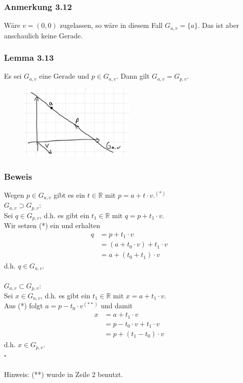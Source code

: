 \documentclass{article}
\begin{document}
\subsubsection*{Anmerkung 3.12}
Wäre $v=(0,0)$ zugelassen, so wäre in diesem Fall $G_{a,v} = \{a\}$. Das ist aber anschaulich keine Gerade. \\

\subsubsection*{Lemma 3.13}
Es sei $G_{a,v}$ eine Gerade und $p \in G_{a,v}$. Dann gilt $G_{a,v} = G_{p,v}$. \\
\begin{figure}[h]
    \centering
    \includegraphics[width=0.5\textwidth]{Images/3.13.jpeg}
    \caption{}
\end{figure}

\subsubsection*{Beweis}
Wegen $p \in G_{a,v}$ gibt es ein $t \in \mathbb{R}$ mit $p = a + t \cdot v.^{(*)}$
\\
\underline{\textit{$G_{a,v} \supset G_{p,v}$}}: \\
Sei $q \in G_{p,v}$, d.h. es gibt ein $t_1 \in \mathbb{R}$ mit $q = p + t_1 \cdot v$. \\
Wir setzen (*) ein und erhalten \\
\begin{align*}
    q &= p + t_1 \cdot v \\
    &= (a + t_0 \cdot v) + t_1 \cdot v \\
    &= a + (t_0 + t_1) \cdot v
\end{align*}
d.h. $q \in G_{a,v}$. \\
\\
\underline{\textit{$G_{a,v} \subset G_{p,v}$}}: \\
Sei $x \in G_{a,v}$, d.h. es gibt ein $t_1 \in \mathbb{R}$ mit $x = a + t_1 \cdot v$. \\
Aus (*) folgt $a=p-t_0 \cdot v^{(**)}$ und damit \\
\begin{align*}
    x &= a + t_1 \cdot v \\
    &= p - t_0 \cdot v + t_1 \cdot v \\
    &= p + (t_1 - t_0) \cdot v
\end{align*}
d.h. $x \in G_{p,v}$. \\
$\square$ \\
\\
Hinweis: (**) wurde in Zeile 2 benutzt. \\
\\
\end{document}
